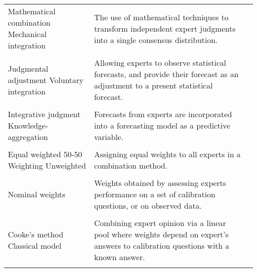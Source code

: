 \documentclass[preprint,authoryear]{elsarticle}
\begin{document}
\begin{longtable}{L{6cm} L{5cm} L{3cm}}
         Mathematical combination \hspace{35mm}
         Mechanical integration      & The use of mathematical techniques to transform independent expert judgments into a single consensus distribution. & 
         \citep{ISI:000296286100010,petrovic2006fuzzy}\\
         \vspace{0.0625mm}\\    
         
         Judgmental adjustment
         Voluntary integration & Allowing experts to observe statistical forecasts, and provide their forecast as an adjustment to a present statistical forecast. & 
         \citep{alvarado2017expertise,huang2016improving,song2013combining,baecke2017investigating}\\
        \vspace{0.0625mm}\\    
         
         Integrative judgment
         Knowledge-aggregation & Forecasts from experts are incorporated into a forecasting model as a predictive variable. & 
         \citep{baecke2017investigating,mak1996aggregating}\\ 
         \vspace{0.0625mm}\\    
         
         Equal weighted  \hspace{35mm} 
         50-50 Weighting \hspace{35mm} 
         Unweighted & Assigning equal weights to all experts in a combination method. & 
         \citep{cooke2014out,hanea2018value,alvarado2017expertise,ISI:000327676900001,graefe2015accuracy}\\
         \vspace{0.0625mm}\\    
         
         Nominal weights & Weights obtained by assessing experts performance on a set of calibration questions, or on observed data.
         & \citep{baldwin2015weighting}\\
        \vspace{0.0625mm}\\     
         
         Cooke's method\hspace{35mm}
         Classical model & Combining expert opinion via a linear pool where weights depend on expert's answers to calibration questions with a known answer. &
         \citep{cooke2014out,morales2017characterization,zio1996use,hanea2018value,hathout2016uncertainty,ISI:000391078100005,ISI:000296286100010,brito2012behavioral,hora2015calibration, ISI:000327676900001}\\ 
        \vspace{0.0625mm}\\    
          

\end{longtable}
\end{document}
